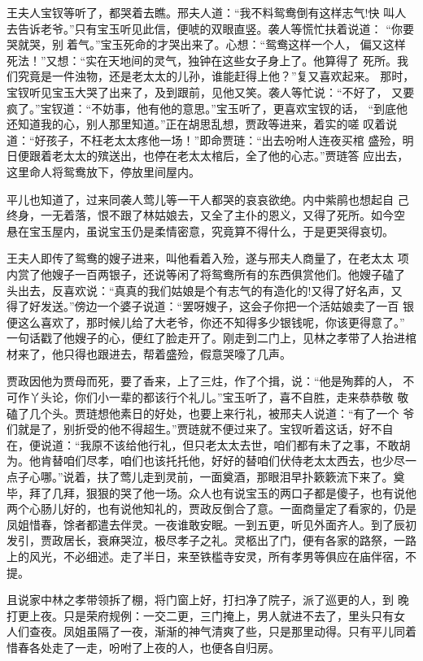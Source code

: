 王夫人宝钗等听了，都哭着去瞧。邢夫人道：“我不料鸳鸯倒有这样志气!快
叫人去告诉老爷。”只有宝玉听见此信，便唬的双眼直竖。袭人等慌忙扶着说道：
“你要哭就哭，别着气。”宝玉死命的才哭出来了。心想：“鸳鸯这样一个人，
偏又这样死法！”又想：“实在天地间的灵气，独钟在这些女子身上了。他算得了
死所。我们究竟是一件浊物，还是老太太的儿孙，谁能赶得上他？”复又喜欢起来。
那时，宝钗听见宝玉大哭了出来了，及到跟前，见他又笑。袭人等忙说：“不好了，
又要疯了。”宝钗道：“不妨事，他有他的意思。”宝玉听了，更喜欢宝钗的话，
“到底他还知道我的心，别人那里知道。”正在胡思乱想，贾政等进来，着实的嗟
叹着说道：“好孩子，不枉老太太疼他一场！”即命贾琏：“出去吩咐人连夜买棺
盛殓，明日便跟着老太太的殡送出，也停在老太太棺后，全了他的心志。”贾琏答
应出去，这里命人将鸳鸯放下，停放里间屋内。

平儿也知道了，过来同袭人莺儿等一干人都哭的哀哀欲绝。内中紫鹃也想起自
己终身，一无着落，恨不跟了林姑娘去，又全了主仆的恩义，又得了死所。如今空
悬在宝玉屋内，虽说宝玉仍是柔情密意，究竟算不得什么，于是更哭得哀切。

王夫人即传了鸳鸯的嫂子进来，叫他看着入殓，遂与邢夫人商量了，在老太太
项内赏了他嫂子一百两银子，还说等闲了将鸳鸯所有的东西俱赏他们。他嫂子磕了
头出去，反喜欢说：“真真的我们姑娘是个有志气的有造化的!又得了好名声，又
得了好发送。”傍边一个婆子说道：“罢呀嫂子，这会子你把一个活姑娘卖了一百
银便这么喜欢了，那时候儿给了大老爷，你还不知得多少银钱呢，你该更得意了。”
一句话戳了他嫂子的心，便红了脸走开了。刚走到二门上，见林之孝带了人抬进棺
材来了，他只得也跟进去，帮着盛殓，假意哭嚎了几声。

贾政因他为贾母而死，要了香来，上了三炷，作了个揖，说：“他是殉葬的人，
不可作丫头论，你们小一辈的都该行个礼儿。”宝玉听了，喜不自胜，走来恭恭敬
敬磕了几个头。贾琏想他素日的好处，也要上来行礼，被邢夫人说道：“有了一个
爷们就是了，别折受的他不得超生。”贾琏就不便过来了。宝钗听着这话，好不自
在，便说道：“我原不该给他行礼，但只老太太去世，咱们都有未了之事，不敢胡
为。他肯替咱们尽孝，咱们也该托托他，好好的替咱们伏侍老太太西去，也少尽一
点子心哪。”说着，扶了莺儿走到灵前，一面奠酒，那眼泪早扑簌簌流下来了。奠
毕，拜了几拜，狠狠的哭了他一场。众人也有说宝玉的两口子都是傻子，也有说他
两个心肠儿好的，也有说他知礼的，贾政反倒合了意。一面商量定了看家的，仍是
凤姐惜春，馀者都遣去伴灵。一夜谁敢安眠。一到五更，听见外面齐人。到了辰初
发引，贾政居长，衰麻哭泣，极尽孝子之礼。灵柩出了门，便有各家的路祭，一路
上的风光，不必细述。走了半日，来至铁槛寺安灵，所有孝男等俱应在庙伴宿，不
提。

且说家中林之孝带领拆了棚，将门窗上好，打扫净了院子，派了巡更的人，到
晚打更上夜。只是荣府规例：一交二更，三门掩上，男人就进不去了，里头只有女
人们查夜。凤姐虽隔了一夜，渐渐的神气清爽了些，只是那里动得。只有平儿同着
惜春各处走了一走，吩咐了上夜的人，也便各自归房。

